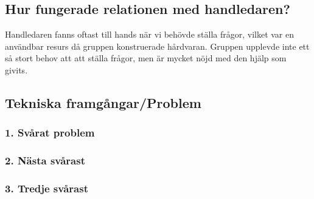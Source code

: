 \documentclass{article}
\begin{document}
\subsection{Hur fungerade relationen med handledaren?}
Handledaren fanns oftast till hands när vi behövde ställa frågor, vilket var en användbar resurs då gruppen konstruerade hårdvaran. Gruppen upplevde inte ett så stort behov att att ställa frågor, men är mycket nöjd med den hjälp som givits.

\subsection{Tekniska framgångar/Problem}

\subsubsection{1. Svårat problem}
\subsubsection{2. Nästa svårast}
\subsubsection{3. Tredje svårast}
\end{document}
